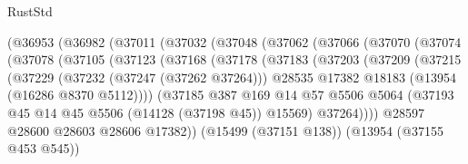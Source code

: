 \begin{lexlean}{RustStd}
\begin{coremodule}
                    (@36953
                      (@36982
                        (@37011
                          (@37032
                            (@37048
                              (@37062
                                (@37066
                                  (@37070
                                    (@37074
                                      (@37078
                                        (@37105
                                          (@37123
                                            (@37168
                                              (@37178
                                                (@37183
                                                  (@37203
                                                    (@37209
                                                      (@37215
                                                        (@37229
                                                          (@37232 (@37247 (@37262 @37264)))
                                                          @28535
                                                          @17382
                                                          @18183
                                                          (@13954 (@16286 @8370 @5112))))
                                                      (@37185
                                                        @387
                                                        @169
                                                        @14
                                                        @57
                                                        @5506
                                                        @5064
                                                        (@37193
                                                          @45
                                                          @14
                                                          @45
                                                          @5506
                                                          (@14128 (@37198 @45))
                                                          @15569)
                                                        @37264))))
                                                @28597
                                                @28600
                                                @28603
                                                @28606
                                                @17382))
                                            (@15499 (@37151 @138))
                                            (@13954 (@37155 @453 @545))

\end{coremodule}
\end{lexlean}
